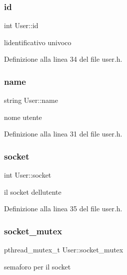 \subsubsection{\texorpdfstring{id}{id}}
{\footnotesize\ttfamily int User\+::id}



l\textquotesingle{}identificativo univoco 



Definizione alla linea 34 del file user.\+h.

\mbox{\label{structUser_a643f85779a4693855c171c396f49e515}} 
\subsubsection{\texorpdfstring{name}{name}}
{\footnotesize\ttfamily string User\+::name}



nome utente 



Definizione alla linea 31 del file user.\+h.

\mbox{\label{structUser_a43525e5e65a2388d5d1239bf62f256fb}} 
\subsubsection{\texorpdfstring{socket}{socket}}
{\footnotesize\ttfamily int User\+::socket}



il socket dell\textquotesingle{}utente 



Definizione alla linea 35 del file user.\+h.

\mbox{\label{structUser_a88aa1435ade9479d9229a6d251152bde}} 
\subsubsection{\texorpdfstring{socket\+\_\+mutex}{socket\_mutex}}
{\footnotesize\ttfamily pthread\+\_\+mutex\+\_\+t User\+::socket\+\_\+mutex}



semaforo per il socket 



